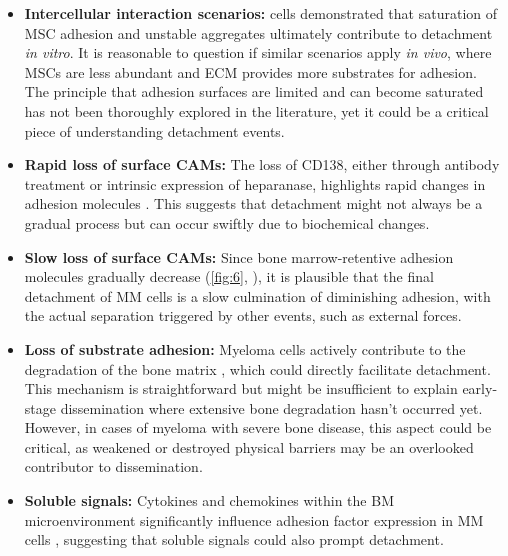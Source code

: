 \begin{itemize}

      \item\textbf{Intercellular interaction scenarios:} \INA cells demonstrated
            that saturation of MSC adhesion and unstable aggregates ultimately
            contribute to detachment \textit{in vitro}. It is reasonable to
            question if similar scenarios apply \textit{in vivo}, where MSCs are
            less abundant and ECM provides more substrates for adhesion. The
            principle that adhesion surfaces are limited and can become
            saturated has not been thoroughly explored in the literature, yet it
            could be a critical piece of understanding detachment events.

      \item\textbf{Rapid loss of surface \acp{CAM}:} The loss of CD138, either
            through antibody treatment or intrinsic expression of heparanase,
            highlights rapid changes in adhesion molecules
            \cite{yangHeparanasePromotesSpontaneous2005,
                  akhmetzyanovaDynamicCD138Surface2020}. This suggests that detachment
            might not always be a gradual process but can occur swiftly due to
            biochemical changes.

      \item\textbf{Slow loss of surface \acp{CAM}:} Since bone marrow-retentive
            adhesion molecules gradually decrease (\autoref{fig:6},
            ), it is plausible that the final detachment of MM
            cells is a slow culmination of diminishing adhesion, with the actual
            separation triggered by other events, such as external forces.

      \item\textbf{Loss of substrate adhesion:} Myeloma cells actively
            contribute to the degradation of the bone matrix
            \cite{terposPathogenesisBoneDisease2018}, which could directly
            facilitate detachment. This mechanism is straightforward but might
            be insufficient to explain early-stage dissemination where extensive
            bone degradation hasn't occurred yet. However, in cases of myeloma with
            severe bone disease, this aspect could be critical, as weakened
            or destroyed physical barriers may be an overlooked contributor to
            dissemination.

      \item\textbf{Soluble signals:} Cytokines and chemokines within the BM
            microenvironment significantly influence adhesion factor expression
            in MM cells \cite{aggarwalChemokinesMultipleMyeloma2006,
                  alsayedMechanismsRegulationCXCR42007}, suggesting that soluble
            signals could also prompt detachment.


\end{itemize}
